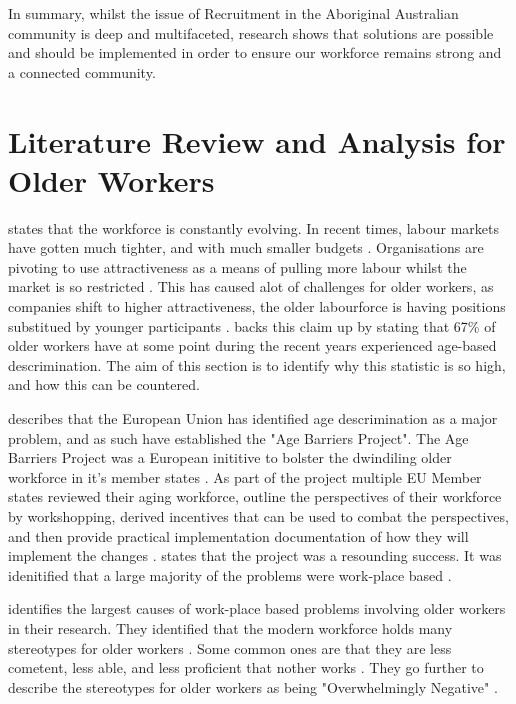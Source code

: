 \documentclass{article}
\begin{document}
In summary, whilst the issue of Recruitment in the Aboriginal Australian community is deep and multifaceted, research shows that solutions are possible and should be implemented in order to ensure our workforce remains strong and a connected community. 

\section{Literature Review and Analysis for Older Workers}
\cite{lievensRecruitingHiringOlder2012} states that the workforce is constantly evolving. In recent times, labour markets have gotten much tighter, and with much smaller budgets \cite{lievensRecruitingHiringOlder2012}. Organisations are pivoting to use attractiveness as a means of pulling more labour whilst the market is so restricted \cite{lievensRecruitingHiringOlder2012}. This has caused alot of challenges for older workers, as companies shift to higher attractiveness, the older labourforce is having positions substitued by younger participants \parencite{drydakisInclusiveRecruitmentHiring2017}. \cite{drydakisInclusiveRecruitmentHiring2017} backs this claim up by stating that 67\% of older workers have at some point during the recent years experienced age-based descrimination. The aim of this section is to identify why this statistic is so high, and how this can be countered.

\cite{walkerCombatingAgeDiscrimination1999} describes that the European Union has identified age descrimination as a major problem, and as such have established the "Age Barriers Project". The Age Barriers Project was a European inititive to bolster the dwindiling older workforce in it's member states \parencite{walkerCombatingAgeBarriers1998}. As part of the project multiple EU Member states reviewed their aging workforce, outline the perspectives of their workforce by workshopping, derived incentives that can be used to combat the perspectives, and then provide practical implementation documentation of how they will implement the changes \parencite{walkerCombatingAgeBarriers1998}. \cite{walkerCombatingAgeDiscrimination1999} states that the project was a resounding success. It was idenitified that a large majority of the problems were work-place based \parencite{walkerCombatingAgeDiscrimination1999}. 

\cite{marchiondoDevelopmentValidationWorkplace2016} identifies the largest causes of work-place based problems involving older workers in their research. They identified that the modern workforce holds many stereotypes for older workers \parencite{marchiondoDevelopmentValidationWorkplace2016}. Some common ones are that they are less cometent, less able, and less proficient that nother works \parencite{marchiondoDevelopmentValidationWorkplace2016}. They go further to describe the stereotypes for older workers as being "Overwhelmingly Negative" \parencite{marchiondoDevelopmentValidationWorkplace2016}.
\end{document}
